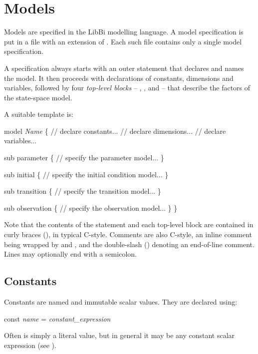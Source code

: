 \section{Models\label{Models}}

Models are specified in the LibBi modelling language. A model specification is
put in a file with an extension of . Each such file contains only a
single model specification.

A specification always starts with an outer  statement that
declares and names the model. It then proceeds with declarations of constants,
dimensions and variables, followed by four \emph{top-level blocks} --
, ,  and
 -- that describe the factors of the state-space model.

A suitable template is:
\begin{bicode}
model \textsl{Name} \{
  // declare constants...
  // declare dimensions...
  // declare variables...

  sub parameter \{
    // specify the parameter model...
  \}

  sub initial \{
    // specify the initial condition model...
  \}

  sub transition \{
    // specify the transition model...
  \}

  sub observation \{
    // specify the observation model...
  \}
\}
\end{bicode}

Note that the contents of the  statement and each top-level block
are contained in curly braces (\bitt{\{\(\ldots\)\}}), in typical
C-style. Comments are also C-style, an inline comment being wrapped by
\bitt{/*} and \bitt{*/}, and the double-slash (\bitt{//}) denoting an
end-of-line comment. Lines may optionally end with a semicolon.

\subsection{Constants\label{Constants}}

Constants are named and immutable scalar values. They are declared using:
\begin{bicode}
const \emph{name} = \emph{constant_expression}
\end{bicode}
Often  is simply a literal value, but in
general it may be any constant scalar expression (see
).

